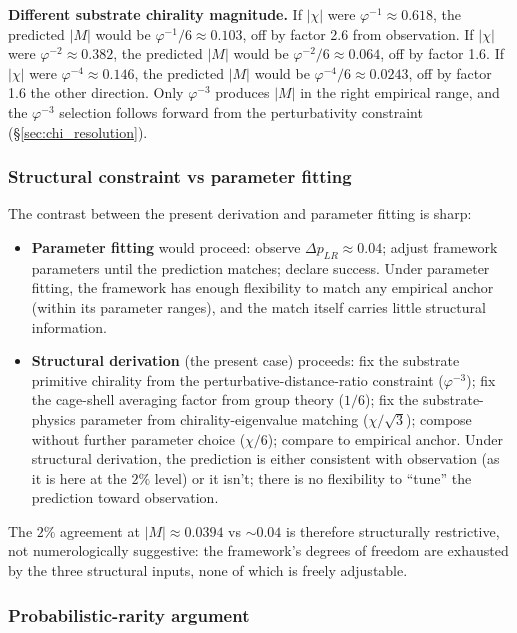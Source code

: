 \documentclass[11pt,letterpaper]{article}
\newcommand{\phig}{\varphi}
\newcommand{\DeltapLR}{\Delta p_{LR}}
\begin{document}
\textbf{Different substrate chirality magnitude.} If $|\chi|$ were $\phig^{-1} \approx 0.618$, the predicted $|M|$ would be $\phig^{-1}/6 \approx 0.103$, off by factor 2.6 from observation. If $|\chi|$ were $\phig^{-2} \approx 0.382$, the predicted $|M|$ would be $\phig^{-2}/6 \approx 0.064$, off by factor 1.6. If $|\chi|$ were $\phig^{-4} \approx 0.146$, the predicted $|M|$ would be $\phig^{-4}/6 \approx 0.0243$, off by factor 1.6 the other direction. Only $\phig^{-3}$ produces $|M|$ in the right empirical range, and the $\phig^{-3}$ selection follows forward from the perturbativity constraint (\S\ref{sec:chi_resolution}).

\subsubsection{Structural constraint vs parameter fitting}\label{sec:constraint_vs_fitting}

The contrast between the present derivation and parameter fitting is sharp:

\begin{itemize}\setlength\itemsep{0.2em}
    \item \textbf{Parameter fitting} would proceed: observe $\DeltapLR \approx 0.04$; adjust framework parameters until the prediction matches; declare success. Under parameter fitting, the framework has enough flexibility to match any empirical anchor (within its parameter ranges), and the match itself carries little structural information.
    \item \textbf{Structural derivation} (the present case) proceeds: fix the substrate primitive chirality from the perturbative-distance-ratio constraint ($\phig^{-3}$); fix the cage-shell averaging factor from group theory ($1/6$); fix the substrate-physics parameter from chirality-eigenvalue matching ($\chi/\sqrt{3}$); compose without further parameter choice ($\chi/6$); compare to empirical anchor. Under structural derivation, the prediction is either consistent with observation (as it is here at the $2\%$ level) or it isn't; there is no flexibility to ``tune'' the prediction toward observation.
\end{itemize}

The $2\%$ agreement at $|M| \approx 0.0394$ vs $\sim 0.04$ is therefore structurally restrictive, not numerologically suggestive: the framework's degrees of freedom are exhausted by the three structural inputs, none of which is freely adjustable.

\subsubsection{Probabilistic-rarity argument}\label{sec:probabilistic_rarity}
\end{document}

